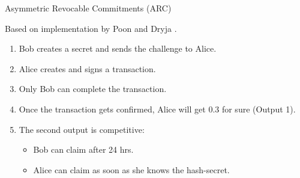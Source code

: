 \documentclass[]{beamer}
\begin{document}
\begin{frame}{Asymmetric Revocable Commitments (ARC)}

\vspace{1 em}
\begin{minipage}{0.4\linewidth}
	
	\begin{figure}
		\begin{tikzpicture}[scale=0.5, every node/.style={scale=0.5}]
						
		\end{tikzpicture}
	\end{figure}
	\footnotesize{Based on implementation by Poon and Dryja \cite{poon2016bitcoin}.}
\end{minipage}%
\begin{minipage}{0.6\linewidth}
	\begin{enumerate}
		\item<1-> Bob creates a secret and sends the challenge to Alice.
		\item<2-> Alice creates and signs a transaction.
		\item<3-> Only Bob can complete the transaction.
		\item<4-> Once the transaction gets confirmed, Alice will get 0.3 for sure (Output 1).
		\item<5-> The second output is competitive:
		\begin{itemize}
			\item<5-> Bob can claim after 24 hrs.
			\item<5-> Alice can claim as soon as she knows the hash-secret.
		\end{itemize}
	\end{enumerate}
\end{minipage}

\vspace{1.2 em}


\end{frame}
\end{document}
